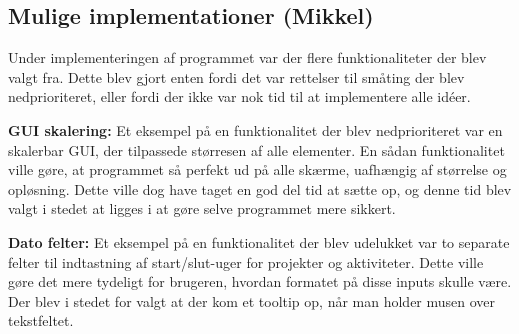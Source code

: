 \subsection{Mulige implementationer (Mikkel)}
Under implementeringen af programmet var der flere funktionaliteter der blev valgt fra. Dette blev gjort enten fordi det var rettelser til småting der blev nedprioriteret, eller fordi der ikke var nok tid til at implementere alle idéer. 

\textbf{GUI skalering:} Et eksempel på en funktionalitet der blev nedprioriteret var en skalerbar GUI, der tilpassede størresen af alle elementer. En sådan funktionalitet ville gøre, at programmet så perfekt ud på alle skærme, uafhængig af størrelse og opløsning. Dette ville dog have taget en god del tid at sætte op, og denne tid blev valgt i stedet at ligges i at gøre selve programmet mere sikkert. 

\textbf{Dato felter:} Et eksempel på en funktionalitet der blev udelukket var to separate felter til indtastning af start/slut-uger for projekter og aktiviteter. Dette ville gøre det mere tydeligt for brugeren, hvordan formatet på disse inputs skulle være. Der blev i stedet for valgt at der kom et tooltip op, når man holder musen over tekstfeltet.  

